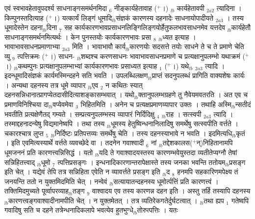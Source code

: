 \documentclass[article,12pt,a4paper]{memoir}%
\newcommand{\add}[1]{($^{+}$#1)}
\begin{document}
	  
	  \pstart \leavevmode%
	एवं स्वभावहेतावुपदर्श्य साधनाङ्गसमर्थनमिदा {\tiny $_{6}$} नीङ्कार्यहेतावाह \add{।} {\tiny $_{lb}$} {\color{DodgerBlue3}कार्यहेतावपी} {\tiny $_{2a2}$} त्यादिना । किम्पुनस्तदित्याह \add{।} {\color{DodgerBlue3}यत्कार्यं लिङ्गं} धूमादि{\tiny $_{lb}$}संज्ञकं {\color{DodgerBlue3}कारणस्य} दहनादेः {\color{DodgerBlue3}साधनायोपादीयते} {\tiny $_{2a3}$} । तस्य धूमादेस्तेन दहना{\tiny $_{lb}$}दिना {\tiny $_{7}$} सह कार्यकारणभावप्रसाधनलिङ्गिलिङ्गयोर्हेतुफलभावसाधनमेव यत्तदेव {\tiny $_{lb}$}कार्यहेतौ साधनाङ्गसमर्थनमित्यर्थः । केन पुनस्तयोः कार्यकारणभावः प्रसा {\tiny $_{8}$} {\tiny $_{lb}$}ध्यत इत्याह । {\color{DodgerBlue3}भावाभावसाधनप्रमाणाभ्या} {\tiny $_{2a3}$} मिति । भावाभावौ कार्य{\tiny $_{lb}$}कारणयोः सदसत्ते तयोः साधने ते च ते प्रमाणे चेति व्यु {\tiny $_{9}$} \leavevmode{} त्पत्तिक्रमः \add{।} साधन- {\tiny $_{lb}$}शब्दश्च करणसाधनः भावाभावसाधनप्रमाणे च प्रत्यक्षानुपलम्भो यथाक्रमं \add{।} {\tiny $_{lb}$}कथम्पुनः प्रत्यक्षानुपलम्भाभ्यां कार्यकारणभावः प्रसाध्यत इत्याह {\tiny $_{1}$} \add{।} यथे{\tiny $_{lb}$} \leavevmode{} {\tiny $_{2a3}$} त्यादि । इदन्धूमादिसंज्ञकं कार्यमस्मिन्दहने सति भवति । उपलब्धिलक्षण{\tiny $_{lb}$}प्राप्तं सदनुपलब्धं प्रागिति वाक्यशेषः कार्यः । अन्यथा दहनस्य तत्र धूमे व्यापार {\tiny $_{lb}$}एव {\tiny $_{2}$} न कथितः स्यात् दहनसन्निधानात्प्रागप्येतदासीदित्याशङ्कासम्भवात् । यथो{\tiny $_{lb}$}क्तानुपलम्भग्रहणे तु नैवेयमवतरति । अत एव च {\color{DodgerBlue3}प्रमाणविनिश्चिया} दा{\tiny $_{lb}$}वप्येवमेवा {\tiny $_{3}$} भिहितमिति । अनेन च प्रत्यक्षप्रमाणव्यापार उक्तः । तथाहि अस्मि{\tiny $_{lb}$}न्सतीदं भवतीति प्रत्यक्षेणैतद् गम्यते । सम्प्रत्यनुपलम्भस्य व्यापारं निर्दिदिक्षु {\tiny $_{4}$} {\tiny $_{lb}$}राह । {\color{DodgerBlue3}सत्स्वपी} {\tiny $_{2a3}$} त्यादि । तस्माद्दहनादन्येषु विद्यमानेष्वपि । तथा तस्य {\tiny $_{lb}$}धूमस्य हेतुष्विन्धनानिलादिषु समर्थेषु सत्स्वपीति वर्त्तते । चकारश्चात्र लुप्त {\tiny $_{5}$} {\tiny $_{lb}$}निर्दिष्टः प्रतिपत्तव्यः समर्थेषु चेति । तस्य दहनस्याभावे न भवति । इदमित्यधि{\tiny $_{lb}$}कृतं । इति एवमित्यस्यार्थे वर्त्तते व्यवच्छेदे वा । तदनेन गवाश्वादी {\tiny $_{6}$} नां {\tiny $_{lb}$}तद्देशकालस\add{न्}निहितानामपि धूमजननं प्रति कारणत्त्वन्निसिद्धं । यतो {\tiny $_{lb}$}यदि ते गवाश्वादयस्तस्य कारणम्भवेयुस्तदा व्यतीतेप्यग्नौ तेषां सन्निहितत्त्वाद् {\tiny $_{lb}$}धूमो {\tiny $_{7}$} त्पत्तिप्रसङ्गः । इन्धनादिकारणान्तरापेक्षास्ते तस्य जनका भवन्ति ततोयम{\tiny $_{lb}$}प्रसङ्ग इति चेत् । यद्येवं तेपि तत्र सन्निहिता एवेति न व्यावर्त्तते प्रसङ्ग इति {\tiny $_{lb}$}द {\tiny $_{8}$} हनमपि सहकारिणमपेक्ष्य तं जनयन्ति ततो न युक्तमिदमिति चेत् । नन्वेवं {\tiny $_{lb}$}सत्यायातन्दहनस्य धूमोर्त्पत्तिं प्रति कारणत्त्वं । तक्तिमिदमुच्यते पूर्व्वापरव्याह{\tiny $_{lb}$}तङ्ग {\tiny $_{9}$} \leavevmode{} वाश्वादय एव तस्य कारणन्न दहन इति । अस्तु तर्हि तस्यापि दहनस्य {\tiny $_{lb}$}कारणत्त्वङ्गवाश्वादीनामपीति चेत् । न युक्तमेतत् । तत्र व्यतिरेकगतेर्दुर्घटत्वात् । {\tiny $_{lb}$}तथा ह्यप {\tiny $_{1}$} गतेष्वपि गवादिषु सति च दहने तत्रेन्धनादिकलापे भवत्येव हुतभुग्धे{\tiny $_{lb}$}तोरुत्पत्तिः । यतः 
\end{document}
